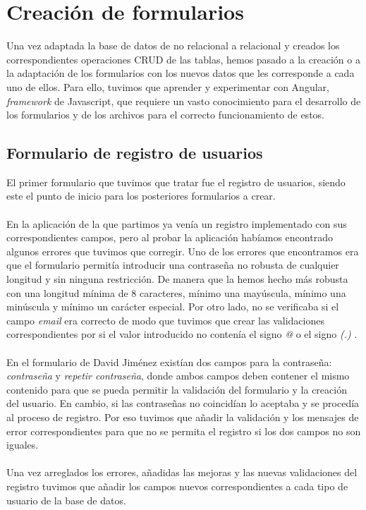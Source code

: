 \documentclass[11pt]{book}
\begin{document}
	\chapter{Creación de formularios}\label{cap:formularios}
	Una vez adaptada la base de datos de no relacional a relacional y creados los correspondientes operaciones CRUD de las tablas, hemos pasado a la creación o a la adaptación de los formularios con los nuevos datos que les corresponde a cada uno de ellos. Para ello, tuvimos que aprender y experimentar con Angular, \emph{framework} de Javascript, que requiere un vasto conocimiento para el desarrollo de los formularios y de los archivos para el correcto funcionamiento de estos.
	\section{Formulario de registro de usuarios}
	El primer formulario que tuvimos que tratar fue el registro de usuarios, siendo este el punto de inicio para los posteriores formularios a crear.\\\\
	En la aplicación de la que partimos ya venía un registro implementado con sus correspondientes campos, pero al probar la aplicación habíamos encontrado algunos errores que tuvimos que corregir. Uno de los errores que encontramos era que el formulario permitía introducir una contraseña no robusta de cualquier longitud y sin ninguna restricción. De manera que la hemos hecho más robusta con una longitud mínima de 8 caracteres, mínimo una mayúscula, mínimo una minúscula y mínimo un carácter especial. Por otro lado, no se verificaba si el campo \emph{email} era correcto de modo que tuvimos que crear las validaciones correspondientes por si el valor introducido no contenía el signo \emph{@} o el signo \emph{(.)} .\\\\
	En el formulario de David Jiménez existían dos campos para la contraseña: \emph{contraseña} y   \emph{repetir contraseña}, donde ambos campos deben contener el mismo contenido para que se pueda permitir la validación del formulario y la creación del usuario. En cambio, si las contraseñas no coincidían lo aceptaba y se procedía al proceso de registro. Por eso tuvimos que añadir la validación y los mensajes de error correspondientes para que no se permita el registro si los dos campos no son iguales.\\\\
	Una vez arreglados los errores, añadidas las mejoras y las nuevas validaciones del registro tuvimos que añadir los campos nuevos correspondientes a cada tipo de usuario de la base de datos. \\\\
\end{document}
